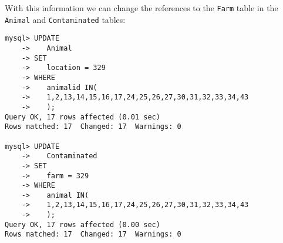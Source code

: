 \documentclass[11pt]{article}
\begin{document}
With this information we can change the references to the \verb|Farm| table in the \verb|Animal| and \verb|Contaminated| tables:

\begin{verbatim}
mysql> UPDATE
    ->    Animal
    -> SET
    ->    location = 329
    -> WHERE
    ->    animalid IN(
    ->    1,2,13,14,15,16,17,24,25,26,27,30,31,32,33,34,43
    ->    );
Query OK, 17 rows affected (0.01 sec)
Rows matched: 17  Changed: 17  Warnings: 0

mysql> UPDATE
    ->    Contaminated
    -> SET
    ->    farm = 329
    -> WHERE
    ->    animal IN(
    ->    1,2,13,14,15,16,17,24,25,26,27,30,31,32,33,34,43
    ->    );
Query OK, 17 rows affected (0.00 sec)
Rows matched: 17  Changed: 17  Warnings: 0
\end{verbatim}
\end{document}
